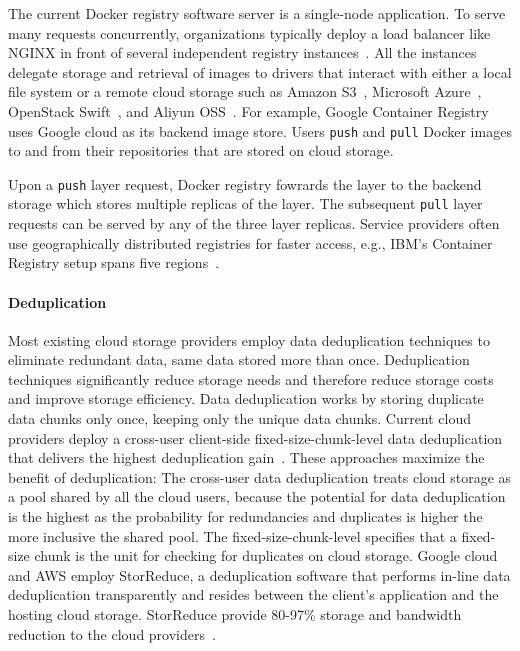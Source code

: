 %
%
The current Docker registry software server is a single-node application.
%
To serve many requests concurrently, organizations typically deploy a load
balancer like NGINX in front of several independent registry
instances~\cite{dockerworkload, anwar-cloud19}.
%
All the instances delegate storage and retrieval of images to drivers that interact with
either a local file system or a remote cloud storage such as Amazon
S3~\cite{s3}, Microsoft Azure~\cite{azure}, OpenStack Swift~\cite{swift}, and
Aliyun OSS~\cite{aliyun}.
%
For example, Google Container Registry~\cite{GoogleContainerRegistry} uses
Google cloud as its backend image store. 
%
Users \texttt{push} and \texttt{pull}
Docker images to and from their repositories that are stored on cloud storage.
%



%
Upon a \texttt{push} layer request, Docker registry fowrards the layer to the
backend storage which stores multiple replicas of the layer.
%
The subsequent \texttt{pull} layer requests can be served by any of the three
layer replicas.  Service providers often use geographically distributed
registries for faster access, e.g., IBM's Container Registry setup spans five
regions~\cite{dockerworkload}. 
%




%
%
\paragraph{Deduplication} Most existing cloud storage providers employ data
deduplication techniques to eliminate redundant data, same data stored more
than once.
%
Deduplication techniques significantly reduce storage needs and therefore
reduce storage costs and improve storage efficiency.
%
Data deduplication works by storing duplicate data chunks only once, keeping
only the unique data chunks. 
%
Current cloud providers deploy a cross-user client-side fixed-size-chunk-level
data deduplication that delivers the highest deduplication
gain~\cite{pooranian2018rare}.
%
These approaches maximize the benefit of deduplication: The cross-user data
deduplication treats cloud storage as a pool shared by all the cloud users,
because the potential for data deduplication is the highest as the probability
for redundancies and duplicates is higher the more inclusive the shared pool.
%
The fixed-size-chunk-level specifies that a fixed-size chunk is the unit for
checking for duplicates on cloud storage.
%
Google cloud and AWS employ StorReduce, a deduplication software that performs
in-line data deduplication transparently and resides between the client's
application and the hosting cloud storage.
%
StorReduce provide 80-97\% storage and bandwidth reduction to the cloud
providers~\cite{StorReduce_google}.
